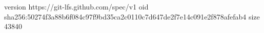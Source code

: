 version https://git-lfs.github.com/spec/v1
oid sha256:50274f3a88b6f084c97f9bd35ca2c0110c7d647de2f7e14c091e2f878afefab4
size 43840
